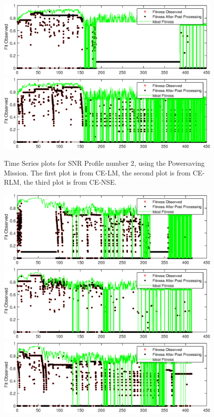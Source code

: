 \begin{appendices}
\begin{figure}[ht!]
\includegraphics{figures/c_sim_timeSeries/Fitness_timeSeries_RLM_2.eps}
\includegraphics{figures/c_sim_timeSeries/Fitness_timeSeries_NSE_2.eps}
\caption{Time Series plots for SNR Profile number 2, using the Powersaving Mission. The first plot is from CE-LM, the second plot is from CE-RLM, the third plot is from CE-NSE.}
\end{figure}
\begin{figure}[ht!]
\includegraphics{figures/c_sim_timeSeries/Fitness_timeSeries_LM_3.eps}
\includegraphics{figures/c_sim_timeSeries/Fitness_timeSeries_RLM_3.eps}
\includegraphics{figures/c_sim_timeSeries/Fitness_timeSeries_NSE_3.eps}

\end{figure}
\end{appendices}
